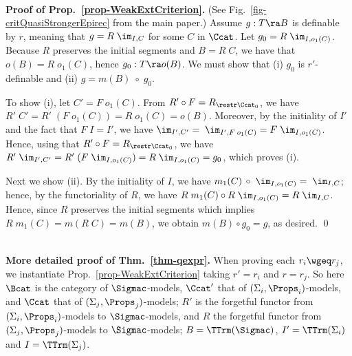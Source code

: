\smallskip 
\ \\
\textbf{Proof of Prop.~\ref{prop-WeakExtCriterion}.}     
% 
%
%
%
%
(See Fig.~\ref{fig-critQuasiStrongerEpirec} from the main paper.)  
Assume $g:T \ra B$ is definable by $r$, meaning that $g = R\;\im_{I,C}$ for some $C$ in $\Ccat$. 	
Let $g_0 = R\;\im_{I,o_1(C)}$. 	
Because $R$ preserves the initial segments and $B = R\;C$, we have 
that $o(B) = R\;o_1(C)$, hence $g_0 : T \ra o(B)$.
We must show that (i) $g_0$ is $r'$-definable and (ii) $g = m(B) \;\circ\; g_0$.   

To show (i), let $C' = F\;o_1(C)$.  From $R' \circ F = R_{\restr\Ccat_0}$, we have $R'\;C' = R'\;(F\;o_1(C)) = R\;o_1(C) = o(B)$.  
Moreover, by the initiality of $I'$ and the fact that $F\;I = I'$, we have $\im_{I',C'} = \;\im_{I',F\;o_1(C)} = F\;\im_{I,o_1(C)}$. 
Hence, using that $R' \circ F = R_{\restr\Ccat_0}$, we have $R'\;\im_{I',C'} = R'\;(F\;\im_{I,o_1(C)}) = R\;\im_{I,o_1(C)} = g_0$, which 
proves  
(i). 

Next we show (ii). 
By the initiality of $I$, we have $m_1(C) \,\circ \;\im_{I,o_1(C)}  = \;\im_{I,C}$; hence, by the functoriality of $R$, we have 
$R\;m_1(C) \circ R\;\im_{I,o_1(C)}  = R\;\im_{I,C}$. Hence, 
since $R$ preserves the initial segments which implies $R\;m_1(C) = m(R\;C) = m(B)$, we obtain $m(B) \circ g_0 = g$, as desired. 
%
\qed

	
\ \\
\textbf{More detailed proof of Thm.~\ref{thm-qexpr}.}     	
%
		When proving each 
		$r_i \wgeq r_j$, we instantiate Prop.~\ref{prop-WeakExtCriterion} %
		taking $r' = r_i$ and $r = r_j$. So here $\Bcat$ is the category of $\Sigmac$-models, $\Ccat'$ that of $(\Sigma_i,\Props_i)$-models, 
		and $\Ccat$ that of $(\Sigma_j,\Props_j)$-models; $R'$ 
		is the forgetful functor from $(\Sigma_i,\Props_i)$-models to $\Sigmac$-models, and $R$ the forgetful functor from $(\Sigma_j,\Props_j)$-models to $\Sigmac$-models; 
		$B=\TTrm(\Sigmac)$, 
		$I'=\TTrm(\Sigma_i)$ and $I=\TTrm(\Sigma_j)$.  
		
